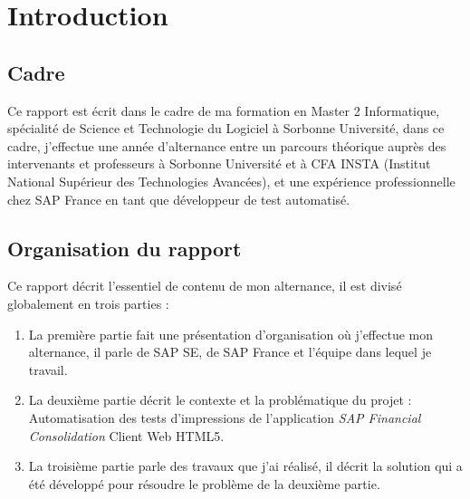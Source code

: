 \section{Introduction}
\subsection{Cadre}
Ce rapport est écrit dans le cadre de ma formation en Master 2 Informatique, spécialité de Science et Technologie du Logiciel à Sorbonne Université, dans ce cadre, j'effectue une année d'alternance entre un parcours théorique auprès des intervenants et professeurs à Sorbonne Université et à CFA INSTA (Institut National Supérieur des Technologies Avancées), et une expérience professionnelle chez SAP France en tant que développeur de test automatisé.


\subsection{Organisation du rapport}
Ce rapport décrit l'essentiel de contenu de mon alternance, il est divisé globalement en trois parties : 
    \begin{enumerate}
        \item La première partie fait une présentation d'organisation où j'effectue mon alternance, il parle de SAP SE, de SAP France et l'équipe dans lequel je travail.
        \item La deuxième partie décrit le contexte et la problématique du projet : Automatisation des tests d'impressions de l'application \textit{SAP Financial Consolidation} Client Web HTML5. 
        \item La troisième partie parle des travaux que j'ai réalisé, il décrit la solution qui a été développé pour résoudre le problème de la deuxième partie.
    \end{enumerate} 
